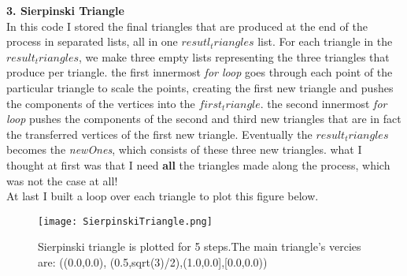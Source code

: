 \documentclass[12pt,a4paper]{article}
\begin{document}
\textbf{3. Sierpinski Triangle}
\\In this code I stored the final triangles that are produced at the end of the process in separated lists, all in one \textit{$resutl_triangles$} list. For each triangle in the \textbf{$result_triangles$}, we make three empty lists representing the three triangles that produce per triangle. the first innermost \textit{for loop} goes through each point of the particular triangle to scale the points, creating the first new triangle and pushes the components of the vertices into the \textit{$first_triangle$}.
the second innermost \textit{for loop} pushes the components of the second and third new triangles that are in fact the transferred vertices of the first new triangle. Eventually the \textbf{$result_triangles$} becomes the  \textit{newOnes}, which consists of these three new triangles.
what I thought at first was that I need \textbf{all} the triangles made along the process, which was not the case at all!
\\At last I built a loop over each triangle to plot this figure below.
\begin{figure}[H]
	\centering
	\texttt{[image: SierpinskiTriangle.png]}
	\caption{Sierpinski triangle is plotted for 5 steps.The main triangle's vercies are: ((0.0,0.0), (0.5,sqrt(3)/2),(1.0,0.0],[0.0,0.0))}
	\label{fig:mesh4}
\end{figure}
\end{document}
